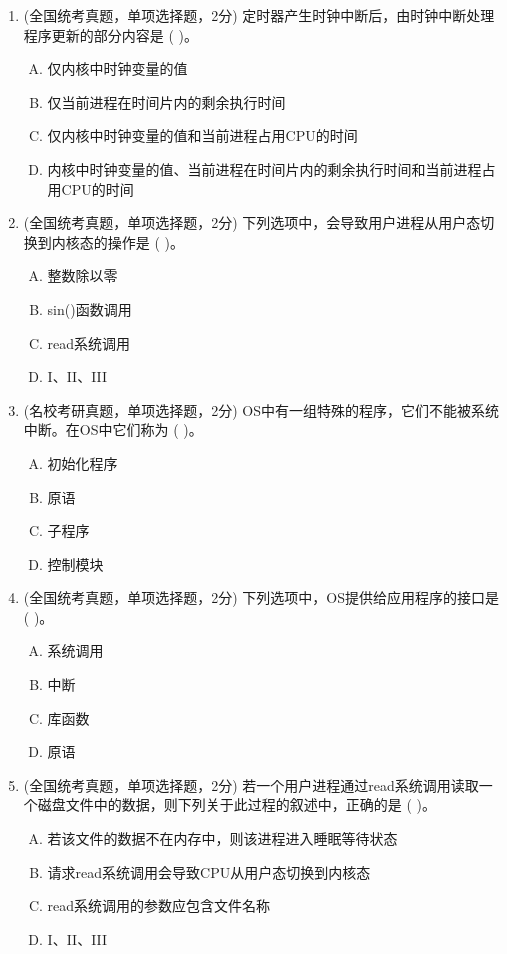 \documentclass[lang=cn,newtx,10pt,scheme=chinese]{../../elegantbook}
\begin{document}
\begin{enumerate}
    \item (全国统考真题，单项选择题，2分) 定时器产生时钟中断后，由时钟中断处理程序更新的部分内容是 (    )。
    \begin{enumerate}[A.]
        \item 仅内核中时钟变量的值
        \item 仅当前进程在时间片内的剩余执行时间
        \item 仅内核中时钟变量的值和当前进程占用CPU的时间
        \item 内核中时钟变量的值、当前进程在时间片内的剩余执行时间和当前进程占用CPU的时间
    \end{enumerate}
    \item (全国统考真题，单项选择题，2分) 下列选项中，会导致用户进程从用户态切换到内核态的操作是 (    )。
    \begin{enumerate}[A.]
        \item 整数除以零
        \item sin()函数调用
        \item read系统调用
        \item I、II、III
    \end{enumerate}

    \item (名校考研真题，单项选择题，2分) OS中有一组特殊的程序，它们不能被系统中断。在OS中它们称为 (    )。
    \begin{enumerate}[A.]
        \item 初始化程序
        \item 原语
        \item 子程序
        \item 控制模块
    \end{enumerate}

    \item (全国统考真题，单项选择题，2分) 下列选项中，OS提供给应用程序的接口是 (    )。
    \begin{enumerate}[A.]
        \item 系统调用
        \item 中断
        \item 库函数
        \item 原语
    \end{enumerate}

    \item (全国统考真题，单项选择题，2分) 若一个用户进程通过read系统调用读取一个磁盘文件中的数据，则下列关于此过程的叙述中，正确的是 (    )。
    \begin{enumerate}[A.]
        \item 若该文件的数据不在内存中，则该进程进入睡眠等待状态
        \item 请求read系统调用会导致CPU从用户态切换到内核态
        \item read系统调用的参数应包含文件名称
        \item I、II、III
    \end{enumerate}


\end{enumerate}
\end{document}
